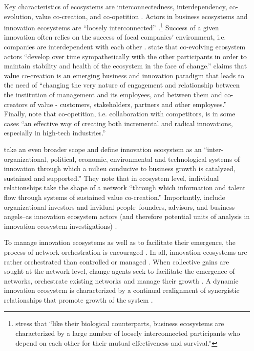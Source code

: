 Key characteristics of ecosystems are 
interconnectedness, 
interdependency,  
co-evolution, 
value co-creation, and 
co-opetition \citep{Jarvi2016TakingReview,Huhtamaki2011AFinancing}.
Actors in business ecosystems and innovation ecosystems are ``loosely interconnected'' \cite{Iansiti2004TheSustainability}.\footnote{\cite{Iansiti2004TheSustainability} stress that ``like their biological counterparts, business ecosystems are characterized by a large number of loosely interconnected participants who depend on each other for their mutual effectiveness and survival.''} Success of a given innovation often relies on the success of focal companies' environment, i.e. companies are interdependent with each other \citep{Adner2010ValueGenerations}. \cite{Thomas2012ModelingLiteratures} state that co-evolving ecosystem actors ``develop over time sympathetically with the other participants in order to maintain stability and health of the ecosystem in the face of change.''
\cite{Ramaswamy2009LeadingValue} claims that value co-creation is an emerging business and innovation paradigm that leads to the need of ``changing the very nature of engagement and relationship between the institution of management and its employees, and between them and co-creators of value - customers, stakeholders, partners and other employees.'' Finally,
\cite{Ritala2009WhatsCoopetition} note that co-opetition, i.e. collaboration with competitors, is in some cases ``an effective way of creating both incremental and radical innovations, especially in high-tech industries.'' 

\cite{Russell2011TransformingOrchestration} take an even broader scope and define innovation ecosystem as an ``inter-organizational, political, economic, environmental and technological systems of innovation through which a milieu conducive to business growth is catalyzed, sustained and supported.'' They note that in ecosystem level, individual relationships take the shape of a network ``through which information and talent flow through systems of sustained value co-creation.'' Importantly, \cite{Russell2011TransformingOrchestration} include organizational investors and invidual people--founders, advisors, and business angels--as innovation ecosystem actors (and therefore potential units of analysis in innovation ecosystem investigations) \cite[cf.][]{Huhtamaki2011AFinancing}.

To manage innovation ecosystems as well as to facilitate their emergence, the process of network orchestration is encouraged \citep{Russell2015RelationalEcosystems}. In all, innovation ecosystems are rather orchestrated than controlled or managed \citep{Russell2011TransformingOrchestration,Ritala2009,Ritala2013,Paquin2013}. When collective gains are sought at the network level, change agents seek to facilitate the emergence of networks, orchestrate existing networks and manage their growth \citep{Russell2011TransformingOrchestration}. A dynamic innovation ecosystem is characterized by a continual realignment of synergistic relationships that promote growth of the system \citep{Russell2015RelationalEcosystems}.


